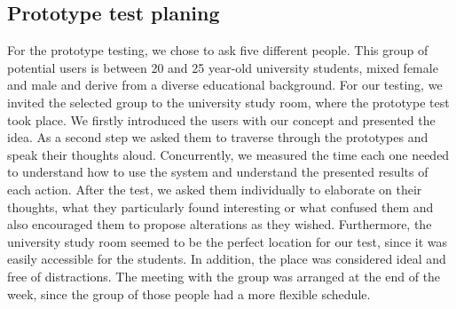 \subsection{Prototype test planing}

For the prototype testing, we chose to ask five different people. This group of 
potential users is between 20 and 25 year-old university students, mixed female 
and male and derive from a diverse educational background. 
For our testing, we invited the selected group to the university study room, 
where the prototype test took place. We firstly introduced the users with our 
concept and presented the idea. As a second step we asked them to traverse 
through the prototypes and speak their thoughts aloud. Concurrently, we measured 
the time each one needed to understand how to use the system and understand the 
presented results of each action. After the test, we asked them individually to 
elaborate on their thoughts, what they particularly found interesting or what 
confused them and also encouraged them to propose alterations as they wished. 
Furthermore, the university study room seemed to be the perfect location for our 
test, since it was easily accessible for the students. In addition, the place 
was considered ideal and free of distractions. 
The meeting with the group was arranged at the end of the week, since the group 
of those people had a more flexible schedule.

